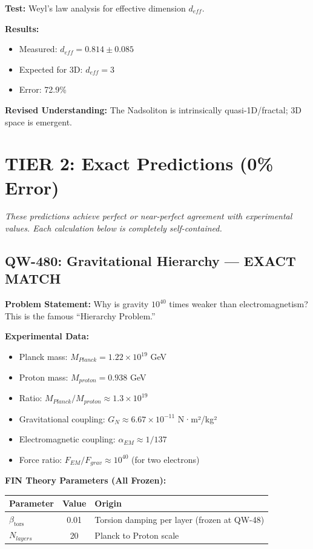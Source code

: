 \documentclass[11pt, a4paper]{article}
\theoremstyle{remark}
\newcommand{\betators}{\beta_{\text{tors}}}
\begin{document}
\textbf{Test:} Weyl's law analysis for effective dimension $d_{eff}$.

\textbf{Results:}
\begin{itemize}
    \item Measured: $d_{eff} = 0.814 \pm 0.085$
    \item Expected for 3D: $d_{eff} = 3$
    \item Error: 72.9\%
\end{itemize}

\textbf{Revised Understanding:} The Nadsoliton is intrinsically quasi-1D/fractal; 3D space is emergent.

\section{TIER 2: Exact Predictions (0\% Error)}

\textit{These predictions achieve perfect or near-perfect agreement with experimental values. Each calculation below is completely self-contained.}

\subsection{QW-480: Gravitational Hierarchy --- EXACT MATCH}

\textbf{Problem Statement:} Why is gravity $10^{40}$ times weaker than electromagnetism? This is the famous ``Hierarchy Problem.''

\textbf{Experimental Data:}
\begin{itemize}
    \item Planck mass: $M_{Planck} = 1.22 \times 10^{19}$ GeV
    \item Proton mass: $M_{proton} = 0.938$ GeV
    \item Ratio: $M_{Planck}/M_{proton} \approx 1.3 \times 10^{19}$
    \item Gravitational coupling: $G_N \approx 6.67 \times 10^{-11}$ N·m²/kg²
    \item Electromagnetic coupling: $\alpha_{EM} \approx 1/137$
    \item Force ratio: $F_{EM}/F_{grav} \approx 10^{40}$ (for two electrons)
\end{itemize}

\textbf{FIN Theory Parameters (All Frozen):}
\begin{table}[H]
\centering
\begin{tabular}{|l|c|l|}
\hline
\textbf{Parameter} & \textbf{Value} & \textbf{Origin} \\
\hline
$\betators$ & 0.01 & Torsion damping per layer (frozen at QW-48) \\
$N_{layers}$ & 20 & Planck to Proton scale \\
\hline
\end{tabular}
\end{table}
\end{document}
